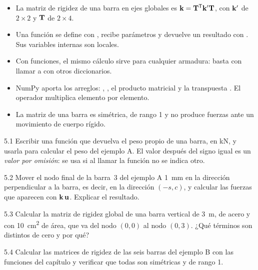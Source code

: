 \repasoyresumen

\begin{itemize}
  \item La matriz de rigidez de una barra en ejes globales es
    $\mathbf{k} = \mathbf{T}^\mathsf{T}\mathbf{k}'\mathbf{T}$, con $\mathbf{k}'$ de $2\times2$ y $\mathbf{T}$ de
    $2\times4$.
  \item Una función se define con , recibe parámetros y devuelve un
    resultado con . Sus variables internas son locales.
  \item Con funciones, el mismo cálculo sirve para cualquier armadura: basta
    con llamar a  con otros diccionarios.
  \item NumPy aporta los arreglos: , , el producto
    matricial  y la transpuesta . El operador \py{*} multiplica
    elemento por elemento.
  \item La matriz de una barra es simétrica, de rango 1 y no produce fuerzas
    ante un movimiento de cuerpo rígido.
\end{itemize}

\ejercicios

\begin{ejercicio}{5.1}
Escribir una función  que devuelva el peso
propio de una barra, en kN, y usarla para calcular el peso del ejemplo A. El
valor después del signo igual es un \emph{valor por omisión}: se usa si al
llamar la función no se indica otro.
\end{ejercicio}

\begin{ejercicio}{5.2}
Mover el nodo final de la barra~3 del ejemplo A \SI{1}{\milli\metre} en la
dirección perpendicular a la barra, es decir, en la dirección $(-s, c)$, y
calcular las fuerzas que aparecen con $\mathbf{k}\,\mathbf{u}$. Explicar el resultado.
\end{ejercicio}

\begin{ejercicio}{5.3}
Calcular la matriz de rigidez global de una barra vertical de
\SI{3}{\metre}, de acero y con \SI{10}{\centi\metre\squared} de área, que va
del nodo $(0, 0)$ al nodo $(0, 3)$. ¿Qué términos son distintos de cero y por
qué?
\end{ejercicio}

\begin{ejercicio}{5.4}
Calcular las matrices de rigidez de las seis barras del ejemplo B con las
funciones del capítulo y verificar que todas son simétricas y de rango 1.
\end{ejercicio}

